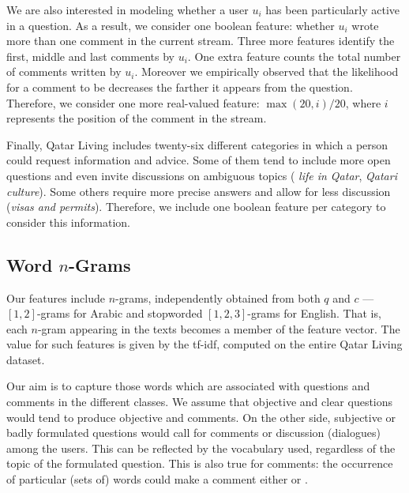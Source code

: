 We are also interested in modeling whether a user $u_i$ has been particularly 
active in a question. As a result, we consider one boolean feature: whether 
$u_i$ wrote more than one comment in the current stream. Three more features 
identify the first, middle and last comments by $u_i$. One extra feature counts 
the total number of comments written by $u_i$. Moreover we empirically observed 
that the likelihood for a comment to be \good decreases the farther it appears 
from the question. Therefore, we consider one more real-valued feature: 
$\max(20, i)/20$, where $i$ represents the position of the comment in the 
stream.

Finally, Qatar Living includes twenty-six different categories in which a person 
could request information and advice. Some of them tend to include more 
open questions and even invite discussions on ambiguous topics (\eg
\textit{life in Qatar}, \textit{Qatari culture}). Some others require more 
precise answers and allow for less discussion (\eg \textit{visas and permits}). 
Therefore, we include one boolean feature per category to consider this 
information. 
 
\subsection{Word $n$-Grams}
\label{ssub:ngrams}

Our features include $n$-grams, independently obtained from both $q$ and $c$ 
---$[1,2]$-grams for Arabic and stopworded $[1,2,3]$-grams for English. That is, 
each $n$-gram appearing in the texts becomes a member of the feature vector. 
The value for such features is given by the tf-idf, computed on the entire Qatar 
Living dataset.

Our aim is to capture those words which are associated with questions and comments 
in the different classes. We assume that objective and clear questions would tend to produce objective and \good comments. On the other side, subjective or badly formulated 
questions would call for \bad comments or discussion (\ie dialogues) among 
the users. This can be reflected by the vocabulary used, regardless of the topic of the formulated question. This is also true for comments: the occurrence of particular (sets of) words could make a comment either \good or \bad.
 
%

